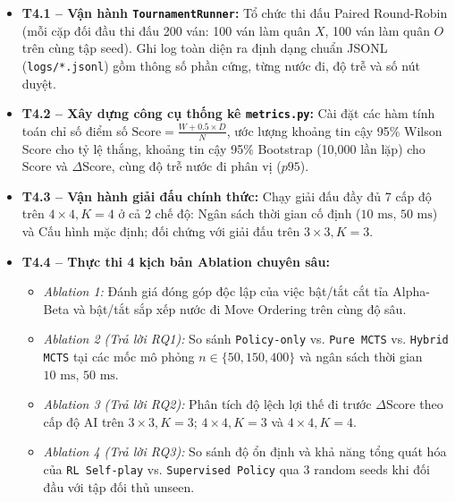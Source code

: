 \documentclass[a4paper,12pt]{report}
\begin{document}
\begin{itemize}
    \item \textbf{T4.1 -- Vận hành \texttt{TournamentRunner}:} Tổ chức thi đấu Paired Round-Robin (mỗi cặp đối đầu thi đấu 200 ván: 100 ván làm quân $X$, 100 ván làm quân $O$ trên cùng tập seed). Ghi log toàn diện ra định dạng chuẩn JSONL (\texttt{logs/*.jsonl}) gồm thông số phần cứng, từng nước đi, độ trễ và số nút duyệt.
    \item \textbf{T4.2 -- Xây dựng công cụ thống kê \texttt{metrics.py}:} Cài đặt các hàm tính toán chỉ số điểm số $\text{Score} = \frac{W + 0.5 \times D}{N}$, ước lượng khoảng tin cậy 95\% Wilson Score cho tỷ lệ thắng, khoảng tin cậy 95\% Bootstrap (10,000 lần lặp) cho $\text{Score}$ và $\Delta\text{Score}$, cùng độ trễ nước đi phân vị ($p95$).
    \item \textbf{T4.3 -- Vận hành giải đấu chính thức:} Chạy giải đấu đầy đủ 7 cấp độ trên $4 \times 4, K=4$ ở cả 2 chế độ: Ngân sách thời gian cố định ($10\text{ ms}$, $50\text{ ms}$) và Cấu hình mặc định; đối chứng với giải đấu trên $3 \times 3, K=3$.
    \item \textbf{T4.4 -- Thực thi 4 kịch bản Ablation chuyên sâu:}
    \begin{itemize}
        \item \textit{Ablation 1:} Đánh giá đóng góp độc lập của việc bật/tắt cắt tỉa Alpha-Beta và bật/tắt sắp xếp nước đi Move Ordering trên cùng độ sâu.
        \item \textit{Ablation 2 (Trả lời RQ1):} So sánh \texttt{Policy-only} vs. \texttt{Pure MCTS} vs. \texttt{Hybrid MCTS} tại các mốc mô phỏng $n \in \{50, 150, 400\}$ và ngân sách thời gian $10\text{ ms}$, $50\text{ ms}$.
        \item \textit{Ablation 3 (Trả lời RQ2):} Phân tích độ lệch lợi thế đi trước $\Delta\text{Score}$ theo cấp độ AI trên $3 \times 3, K=3$; $4 \times 4, K=3$ và $4 \times 4, K=4$.
        \item \textit{Ablation 4 (Trả lời RQ3):} So sánh độ ổn định và khả năng tổng quát hóa của \texttt{RL Self-play} vs. \texttt{Supervised Policy} qua 3 random seeds khi đối đầu với tập đối thủ unseen.
    \end{itemize}
\end{itemize}
\end{document}
